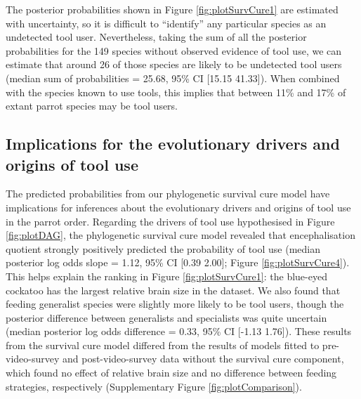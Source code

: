 \documentclass[
  man,floatsintext]{apa6}
\begin{document}
The posterior probabilities shown in Figure \ref{fig:plotSurvCure1} are estimated with uncertainty, so it is difficult to ``identify'' any particular species as an undetected tool user. Nevertheless, taking the sum of all the posterior probabilities for the 149 species without observed evidence of tool use, we can estimate that around 26 of those species are likely to be undetected tool users (median sum of probabilities = 25.68, 95\% CI {[}15.15 41.33{]}). When combined with the species known to use tools, this implies that between 11\% and 17\% of extant parrot species may be tool users.

\hypertarget{implications-for-the-evolutionary-drivers-and-origins-of-tool-use}{%
\subsection{Implications for the evolutionary drivers and origins of tool use}\label{implications-for-the-evolutionary-drivers-and-origins-of-tool-use}}

The predicted probabilities from our phylogenetic survival cure model have implications for inferences about the evolutionary drivers and origins of tool use in the parrot order. Regarding the drivers of tool use hypothesised in Figure \ref{fig:plotDAG}, the phylogenetic survival cure model revealed that encephalisation quotient strongly positively predicted the probability of tool use (median posterior log odds slope = 1.12, 95\% CI {[}0.39 2.00{]}; Figure \ref{fig:plotSurvCure4}). This helps explain the ranking in Figure \ref{fig:plotSurvCure1}: the blue-eyed cockatoo has the largest relative brain size in the dataset. We also found that feeding generalist species were slightly more likely to be tool users, though the posterior difference between generalists and specialists was quite uncertain (median posterior log odds difference = 0.33, 95\% CI {[}-1.13 1.76{]}). These results from the survival cure model differed from the results of models fitted to pre-video-survey and post-video-survey data without the survival cure component, which found no effect of relative brain size and no difference between feeding strategies, respectively (Supplementary Figure \ref{fig:plotComparison}).
\end{document}
